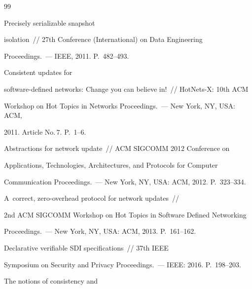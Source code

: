 {\small\frenchspacing


{%




\begin{thebibliography}{99}







     Precisely serializable snapshot 


isolation~/\!\!/ 27th Conference (International) on Data Engineering 


Proceedings.~--- IEEE, 2011. P.~482--493.




     Consistent updates for 


software-defined networks: Change you can believe in!~/\!\!/ HotNets-X:  10th ACM 


Workshop on Hot Topics in Networks Proceedings.~--- New York, NY, USA: ACM, 


2011. Article No.\,7. P.~1--6.






Abstractions for network update~/\!\!/ ACM SIGCOMM 2012 Conference on 


Applications, Technologies, Architectures, and Protocols for Computer 


Communication Proceedings.~--- New York, NY, USA: ACM, 2012. P.~323--334.




     A~correct, zero-overhead protocol for network updates~/\!\!/ 


2nd ACM SIGCOMM Workshop on Hot Topics in Software Defined Networking 


Proceedings.~--- New York, NY, USA: ACM, 2013. P.~161--162. 




     Declarative verifiable SDI specifications~/\!\!/ 37th IEEE 


Symposium on Security and Privacy Proceedings.~--- IEEE: 2016. P.~198--203.




     The notions of consistency and 



\end{thebibliography}}}
